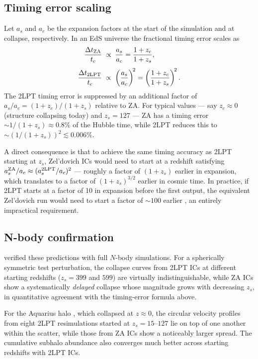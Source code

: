 \documentclass[12pt]{article}
\begin{document}
\subsection{Timing error scaling}

Let $a_s$ and $a_c$ be the expansion factors at the start of the
simulation and at collapse, respectively.  In an EdS universe the
fractional timing error scales as \citep{Jenkins2010}
%
\begin{align}
  \frac{\Delta t_{\rm ZA}}{t_c}   &\;\propto\; \frac{a_s}{a_c}
      = \frac{1+z_c}{1+z_s},
      \label{eq:timing_za} \\[4pt]
  \frac{\Delta t_{\rm 2LPT}}{t_c} &\;\propto\; \left(\frac{a_s}{a_c}\right)^{\!2}
      = \left(\frac{1+z_c}{1+z_s}\right)^{\!2}.
      \label{eq:timing_2lpt}
\end{align}
%
The 2LPT timing error is suppressed by an additional factor of
$a_s/a_c = (1+z_c)/(1+z_s)$ relative to ZA.
For typical values — say $z_c \approx 0$ (structure collapsing today)
and $z_s = 127$ — ZA has a timing error $\sim 1/(1+z_s) \approx 0.8\%$
of the Hubble time, while 2LPT reduces this to $\sim (1/(1+z_s))^2
\lesssim 0.006\%$.

A direct consequence is that to achieve the same timing accuracy as
2LPT starting at $z_s$, Zel'dovich ICs would need to start at a
redshift satisfying $a_s^{\rm ZA}/a_c \approx (a_s^{\rm 2LPT}/a_c)^2$
— roughly a factor of $(1+z_s)$ earlier in expansion, which translates
to a factor of $(1+z_s)^{3/2}$ earlier in cosmic time.
In practice, if 2LPT starts at a factor of 10 in expansion before
the first output, the equivalent Zel'dovich run would need to start
a factor of $\sim\!100$ earlier \citep{Jenkins2010}, an entirely
impractical requirement.

\subsection{N-body confirmation}

\citet{Jenkins2010} verified these predictions with full $N$-body
simulations.
For a spherically symmetric test perturbation, the collapse curves from
2LPT ICs at different starting redshifts ($z_s = 399$ and $599$) are
virtually indistinguishable, while ZA ICs show a systematically
\emph{delayed} collapse whose magnitude grows with decreasing $z_s$,
in quantitative agreement with the timing-error formula above.

For the Aquarius halo \citep{Springel2008}, which collapsed at
$z \approx 0$, the circular velocity profiles from eight 2LPT
resimulations started at $z_s = 15$--$127$ lie on top of one another
within the scatter, while those from ZA ICs show a noticeably
larger spread.
The cumulative subhalo abundance also converges much better across
starting redshifts with 2LPT ICs.
\end{document}
